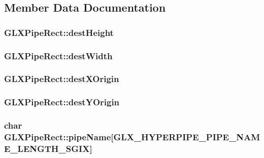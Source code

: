 \subsection{Member Data Documentation}
\hypertarget{struct_g_l_x_pipe_rect_a858b0ea6642e451495aff35cfefbd083}{
\subsubsection[{dest\-Height}]{ G\-L\-X\-Pipe\-Rect\-::dest\-Height}}\label{struct_g_l_x_pipe_rect_a858b0ea6642e451495aff35cfefbd083}
\hypertarget{struct_g_l_x_pipe_rect_a3c07991d2a8fb6e973eae834650b3dad}{
\subsubsection[{dest\-Width}]{ G\-L\-X\-Pipe\-Rect\-::dest\-Width}}\label{struct_g_l_x_pipe_rect_a3c07991d2a8fb6e973eae834650b3dad}
\hypertarget{struct_g_l_x_pipe_rect_a8b7b941894ad3420326d7e9fa885bb71}{
\subsubsection[{dest\-X\-Origin}]{ G\-L\-X\-Pipe\-Rect\-::dest\-X\-Origin}}\label{struct_g_l_x_pipe_rect_a8b7b941894ad3420326d7e9fa885bb71}
\hypertarget{struct_g_l_x_pipe_rect_aef7766b02ef07c20a11e89da5878b469}{
\subsubsection[{dest\-Y\-Origin}]{ G\-L\-X\-Pipe\-Rect\-::dest\-Y\-Origin}}\label{struct_g_l_x_pipe_rect_aef7766b02ef07c20a11e89da5878b469}
\hypertarget{struct_g_l_x_pipe_rect_aa4c4f60e9647705ddefa10f95a37cb79}{
\subsubsection[{pipe\-Name}]{\setlength{\rightskip}{0pt plus 5cm}char G\-L\-X\-Pipe\-Rect\-::pipe\-Name\mbox{[}{\bf G\-L\-X\-\_\-\-H\-Y\-P\-E\-R\-P\-I\-P\-E\-\_\-\-P\-I\-P\-E\-\_\-\-N\-A\-M\-E\-\_\-\-L\-E\-N\-G\-T\-H\-\_\-\-S\-G\-I\-X}\mbox{]}}}\label{struct_g_l_x_pipe_rect_aa4c4f60e9647705ddefa10f95a37cb79}

